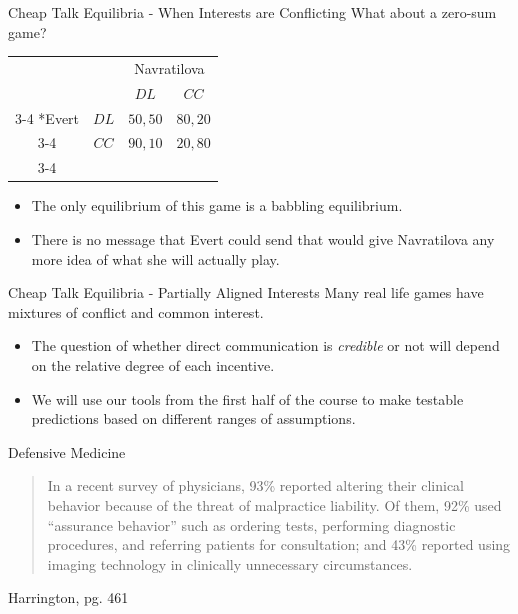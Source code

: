 
\begin{frame}{Cheap Talk Equilibria - When Interests are Conflicting}
  What about a zero-sum game?
  \begin{table}[!h]
    \centering
    \begin{tabular}{cc|c|c|}
    & \multicolumn{1}{c}{} & \multicolumn{2}{c}{Navratilova}\\
    & \multicolumn{1}{c}{} & \multicolumn{1}{c}{$DL$}  & \multicolumn{1}{c}{$CC$} \\\cline{3-4}
    \multirow{2}*{Evert}  & $DL$ & $50, 50$ & $80,20$ \\\cline{3-4}
                          & $CC$ & $90, 10$ & $20,80$ \\\cline{3-4}
  \end{tabular}
  \end{table}
  \begin{itemize}
    \item 
    The only equilibrium of this game is a \alert{babbling} equilibrium.
    \item 
    There is no message that Evert could send
    that would give Navratilova any more idea of what she will actually play.
  \end{itemize}
\end{frame}


\begin{frame}{Cheap Talk Equilibria - Partially Aligned Interests}
  Many real life games have mixtures of conflict and common interest.
  \begin{itemize}
    \item 
    The question of whether direct communication is \textit{credible} or not 
    will depend on the relative degree of each incentive.
    \item 
    We will use our tools from the first half of the course 
    to make testable predictions based on different ranges of assumptions.
  \end{itemize}
\end{frame}


\begin{frame}{Defensive Medicine}
  \begin{quote}
    In a recent survey of physicians,
    93\% reported altering their clinical behavior 
    because of the threat of malpractice liability.
    Of them, 92\% used “assurance behavior” 
    such as ordering tests, performing diagnostic procedures,
    and referring patients for consultation;
    and 43\% reported using imaging technology 
    in clinically unnecessary circumstances. 
  \end{quote}  
  Harrington, pg. 461
\end{frame}

